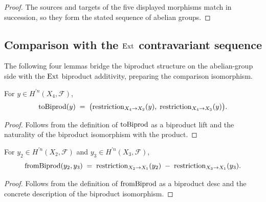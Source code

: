 \begin{proof}
  
  \leanok
  The sources and targets of the five displayed morphisms match in succession, so they form the stated sequence of abelian groups.
\end{proof}

\subsection{Comparison with the \(\operatorname{Ext}\) contravariant sequence}

The following four lemmas bridge the biproduct structure on the abelian-group side with the \(\operatorname{Ext}\) biproduct additivity, preparing the comparison isomorphism.

\begin{lemma}\leanok
  \label{lem:Scheme_HModule_prime_toBiprod_apply}

  For \(y \in H^{\prime n}(X_4, \mathcal F)\),
  \[
    \operatorname{toBiprod}(y) \;=\; \bigl(\mathrm{restriction}_{X_4 \to X_2}(y),\; \mathrm{restriction}_{X_4 \to X_3}(y)\bigr).
  \]
\end{lemma}

\begin{proof}
  
  \leanok
  Follows from the definition of \(\operatorname{toBiprod}\) as a biproduct lift and the naturality of the biproduct isomorphism with the product.
\end{proof}

\begin{lemma}\leanok
  \label{lem:Scheme_HModule_prime_fromBiprod_biprodIsoProd_inv_apply}

  For \(y_2 \in H^{\prime n}(X_2, \mathcal F)\) and \(y_3 \in H^{\prime n}(X_3, \mathcal F)\),
  \[
    \operatorname{fromBiprod}(y_2, y_3) \;=\; \mathrm{restriction}_{X_2 \to X_1}(y_2) \;-\; \mathrm{restriction}_{X_3 \to X_1}(y_3).
  \]
\end{lemma}

\begin{proof}
  
  \leanok
  Follows from the definition of \(\operatorname{fromBiprod}\) as a biproduct desc and the concrete description of the biproduct isomorphism.
\end{proof}


